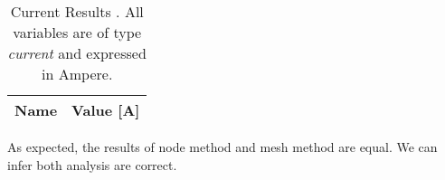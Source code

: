 \begin{table}[ht]
  \centering
  \begin{tabular}{|l|r|}
    \hline    
    {\bf Name} & {\bf Value [A]} \\ \hline
    
  \end{tabular}
  \caption{Current Results . All variables are of type {\em current}
    and expressed in Ampere.}
  \label{tab:validation}
\end{table}

As expected, the results of node method and mesh method are equal. We can infer both analysis are correct.

